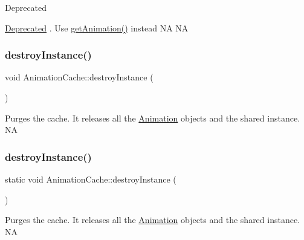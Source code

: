 \begin{DoxyRefDesc}{Deprecated}
\item[\hyperlink{deprecated__deprecated000252}{Deprecated}]. Use \hyperlink{classAnimationCache_ac9674f5e186bcec23f622cd62c1b873a}{get\+Animation()} instead  NA  NA \end{DoxyRefDesc}
\mbox{\label{classAnimationCache_afb31dcea7d004565aaf1b871e59eec30}} 
\subsubsection{\texorpdfstring{destroy\+Instance()}{destroyInstance()}\hspace{0.1cm}{\footnotesize\ttfamily [1/2]}}
{\footnotesize\ttfamily void Animation\+Cache\+::destroy\+Instance (\begin{DoxyParamCaption}{ }\end{DoxyParamCaption})\hspace{0.3cm}{\ttfamily [static]}}

Purges the cache. It releases all the \hyperlink{classAnimation}{Animation} objects and the shared instance.  NA \mbox{\label{classAnimationCache_aae847315aea84ed223f1b2f2731348d5}} 
\subsubsection{\texorpdfstring{destroy\+Instance()}{destroyInstance()}\hspace{0.1cm}{\footnotesize\ttfamily [2/2]}}
{\footnotesize\ttfamily static void Animation\+Cache\+::destroy\+Instance (\begin{DoxyParamCaption}{ }\end{DoxyParamCaption})\hspace{0.3cm}{\ttfamily [static]}}

Purges the cache. It releases all the \hyperlink{classAnimation}{Animation} objects and the shared instance.  NA \mbox{\label{classAnimationCache_ac9674f5e186bcec23f622cd62c1b873a}} 
